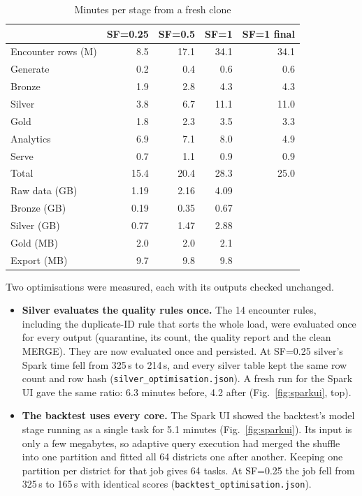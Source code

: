 \begin{table}[htbp]
\caption{Minutes per stage from a fresh clone}
\label{tab:scaling}
\centering\small
\setlength{\tabcolsep}{3.5pt}
\begin{tabular}{@{}lrrrr@{}}
\toprule
 & SF=0.25 & SF=0.5 & SF=1 & SF=1 final \\
\midrule
Encounter rows (M) & 8.5 & 17.1 & 34.1 & 34.1 \\
Generate & 0.2 & 0.4 & 0.6 & 0.6 \\
Bronze & 1.9 & 2.8 & 4.3 & 4.3 \\
Silver & 3.8 & 6.7 & 11.1 & 11.0 \\
Gold & 1.8 & 2.3 & 3.5 & 3.3 \\
Analytics & 6.9 & 7.1 & 8.0 & 4.9 \\
Serve & 0.7 & 1.1 & 0.9 & 0.9 \\
\midrule
Total & 15.4 & 20.4 & 28.3 & 25.0 \\
\midrule
Raw data (GB) & 1.19 & 2.16 & 4.09 & \\
Bronze (GB) & 0.19 & 0.35 & 0.67 & \\
Silver (GB) & 0.77 & 1.47 & 2.88 & \\
Gold (MB) & 2.0 & 2.0 & 2.1 & \\
Export (MB) & 9.7 & 9.8 & 9.8 & \\
\bottomrule
\end{tabular}
\end{table}

Two optimisations were measured, each with its outputs checked unchanged.
\begin{itemize}
\item \textbf{Silver evaluates the quality rules once.} The 14 encounter rules, including the duplicate-ID rule
that sorts the whole load, were evaluated once for every output (quarantine, its count, the quality report and
the clean MERGE). They are now evaluated once and persisted. At SF=0.25 silver's Spark time fell from 325\,s to
214\,s, and every silver table kept the same row count and row hash (\texttt{silver\_optimisation.json}). A fresh run for
the Spark UI gave the same ratio: 6.3 minutes before, 4.2 after (Fig.~\ref{fig:sparkui}, top).
\item \textbf{The backtest uses every core.} The Spark UI showed the backtest's model stage running as a single
task for 5.1 minutes (Fig.~\ref{fig:sparkui}). Its input is only a few megabytes, so adaptive query execution
had merged the shuffle into one partition and fitted all 64 districts one after another. Keeping one partition per
district for that job gives 64 tasks. At SF=0.25 the job fell from 325\,s to 165\,s with identical scores
(\texttt{backtest\_optimisation.json}).
\end{itemize}

